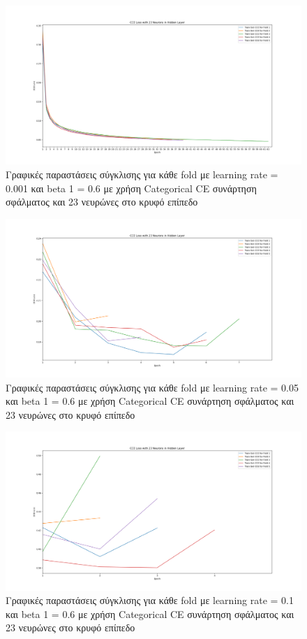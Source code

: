 \documentclass[12pt,a4paper]{article}
\begin{document}
\begin{figure}[H]
	\includegraphics[width=\textwidth]{25. LR 0.001 - Beta1 0.6.png}
	\caption{Γραφικές παραστάσεις σύγκλισης για κάθε fold με learning rate = 0.001 και beta 1 = 0.6 με χρήση Categorical CE συνάρτηση σφάλματος και 23 νευρώνες στο κρυφό επίπεδο}
\end{figure}

\begin{figure}[H]
	\includegraphics[width=\textwidth]{26. LR 0.05 - Beta1 0.6.png}
	\caption{Γραφικές παραστάσεις σύγκλισης για κάθε fold με learning rate = 0.05 και beta 1 = 0.6 με χρήση Categorical CE συνάρτηση σφάλματος και 23 νευρώνες στο κρυφό επίπεδο}
\end{figure}

\begin{figure}[H]
	\includegraphics[width=\textwidth]{27. LR 0.1 - Beta1 0.6.png}
	\caption{Γραφικές παραστάσεις σύγκλισης για κάθε fold με learning rate = 0.1 και beta 1 = 0.6 με χρήση Categorical CE συνάρτηση σφάλματος και 23 νευρώνες στο κρυφό επίπεδο}
\end{figure}
\end{document}
